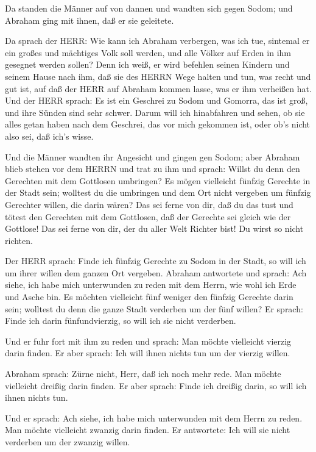  Da standen die Männer auf von dannen und wandten sich
gegen Sodom; und Abraham ging mit ihnen, daß er sie geleitete.

 Da sprach der HERR: Wie kann ich Abraham verbergen, was
ich tue,  sintemal er ein großes und mächtiges Volk soll
werden, und alle Völker auf Erden in ihm gesegnet werden sollen?
 Denn ich weiß, er wird befehlen seinen Kindern und seinem
Hause nach ihm, daß sie des HERRN Wege halten und tun, was recht und gut
ist, auf daß der HERR auf Abraham kommen lasse, was er ihm verheißen
hat.  Und der HERR sprach: Es ist ein Geschrei zu Sodom und
Gomorra, das ist groß, und ihre Sünden sind sehr schwer. 
Darum will ich hinabfahren und sehen, ob sie alles getan haben nach dem
Geschrei, das vor mich gekommen ist, oder ob's nicht also sei, daß ich's
wisse.

 Und die Männer wandten ihr Angesicht und gingen gen Sodom;
aber Abraham blieb stehen vor dem HERRN  und trat zu ihm
und sprach: Willst du denn den Gerechten mit dem Gottlosen umbringen?
 Es mögen vielleicht fünfzig Gerechte in der Stadt sein;
wolltest du die umbringen und dem Ort nicht vergeben um fünfzig
Gerechter willen, die darin wären?  Das sei ferne von dir,
daß du das tust und tötest den Gerechten mit dem Gottlosen, daß der
Gerechte sei gleich wie der Gottlose! Das sei ferne von dir, der du
aller Welt Richter bist! Du wirst so nicht richten.

 Der HERR sprach: Finde ich fünfzig Gerechte zu Sodom in
der Stadt, so will ich um ihrer willen dem ganzen Ort vergeben.
 Abraham antwortete und sprach: Ach siehe, ich habe mich
unterwunden zu reden mit dem Herrn, wie wohl ich Erde und Asche bin.
 Es möchten vielleicht fünf weniger den fünfzig Gerechte
darin sein; wolltest du denn die ganze Stadt verderben um der fünf
willen? Er sprach: Finde ich darin fünfundvierzig, so will ich sie nicht
verderben.

 Und er fuhr fort mit ihm zu reden und sprach: Man möchte
vielleicht vierzig darin finden. Er aber sprach: Ich will ihnen nichts
tun um der vierzig willen.

 Abraham sprach: Zürne nicht, Herr, daß ich noch mehr rede.
Man möchte vielleicht dreißig darin finden. Er aber sprach: Finde ich
dreißig darin, so will ich ihnen nichts tun.

 Und er sprach: Ach siehe, ich habe mich unterwunden mit
dem Herrn zu reden. Man möchte vielleicht zwanzig darin finden. Er
antwortete: Ich will sie nicht verderben um der zwanzig willen.

